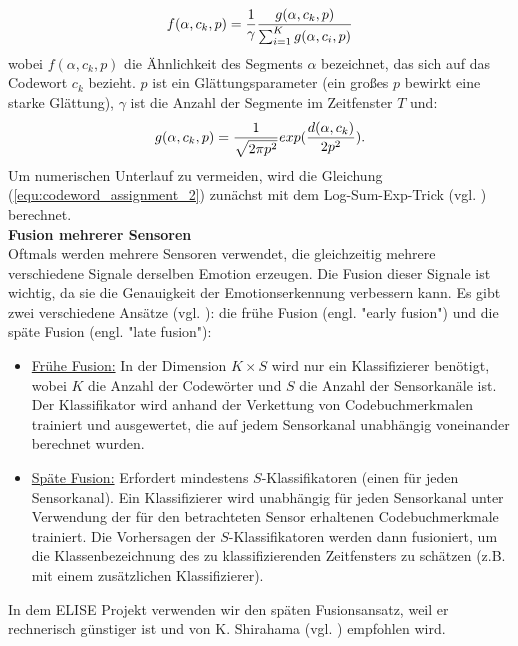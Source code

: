 \begin{equation} 
\Large{ {f(\alpha,c_k,p) = \frac{1}{\gamma}} \frac{g(\alpha,c_k,p)}{\sum_{i=1}^{K} g(\alpha,c_i,p)}}
\end{equation}
\newline
wobei $f(\alpha,c_k,p)$ die Ähnlichkeit des Segments $\alpha$ bezeichnet, das sich auf das Codewort $c_k$ bezieht. $p$ ist ein Glättungsparameter (ein großes $p$ bewirkt eine starke Glättung), $\gamma$ ist die Anzahl der Segmente im Zeitfenster $T$ und: \\
\begin{equation} 
\Large{ { g(\alpha,c_k,p) = \frac{1}{\sqrt{2 \pi p^{ 2 }}}} exp(\frac{d(\alpha,c_k)}{2p^{2}}). }
\label{equ:codeword_assignment_2} \end{equation}
\newline
Um numerischen Unterlauf zu vermeiden, wird die Gleichung (\ref{equ:codeword_assignment_2}) zunächst mit dem Log-Sum-Exp-Trick (vgl. \cite{murphy_2012}) berechnet. \\


\textbf{Fusion mehrerer Sensoren \\}
Oftmals werden mehrere Sensoren verwendet, die gleichzeitig mehrere verschiedene Signale derselben Emotion erzeugen.
Die Fusion dieser Signale ist wichtig, da sie die Genauigkeit der Emotionserkennung verbessern kann.
Es gibt zwei verschiedene Ansätze (vgl. \cite{snoek_2005}): die frühe Fusion (engl. "early fusion") und die späte Fusion (engl. "late fusion"): 

\begin{itemize}
  \item \underline{Frühe Fusion:} In der Dimension $K \times S$ wird nur ein Klassifizierer benötigt, wobei $K$ die Anzahl der Codewörter und $S$ die Anzahl der Sensorkanäle ist. Der Klassifikator wird anhand der Verkettung von Codebuchmerkmalen trainiert und ausgewertet, die auf jedem Sensorkanal unabhängig voneinander berechnet wurden.

  \item \underline{Späte Fusion:} Erfordert mindestens $S$-Klassifikatoren (einen für jeden Sensorkanal). Ein Klassifizierer wird unabhängig für jeden Sensorkanal unter Verwendung der für den betrachteten Sensor erhaltenen Codebuchmerkmale trainiert. Die Vorhersagen der $S$-Klassifikatoren werden dann fusioniert, um die Klassenbezeichnung des zu klassifizierenden Zeitfensters zu schätzen (z.B. mit einem zusätzlichen Klassifizierer).
\end{itemize} \vspace{0.5cm}


In dem ELISE Projekt verwenden wir den späten Fusionsansatz, weil er rechnerisch günstiger ist und von K. Shirahama (vgl. \cite{kimiaki_codebook_approach_2016}) empfohlen wird. \\